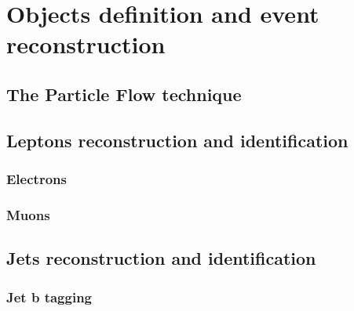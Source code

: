 \section{Objects definition and event reconstruction}
\label{sec:Objects}


\subsection{The Particle Flow technique}

\subsection{Leptons reconstruction and identification}

	\subsubsection{Electrons}
	
	\subsubsection{Muons}
	
\subsection{Jets reconstruction and identification}

	\subsubsection{Jet b tagging}

